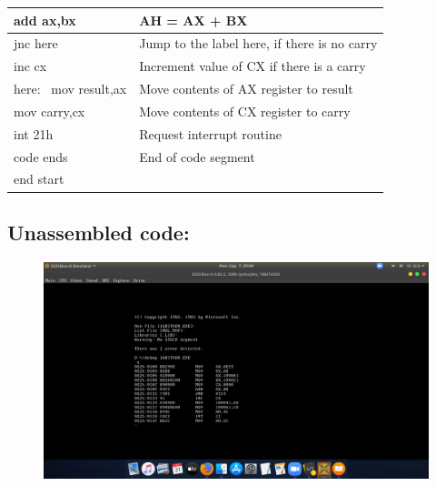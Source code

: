 \documentclass[12pt,a4paper]{article}
\begin{document}
\begin{flushleft}
\begin{table}[htb]
{\begin{tabular}{|l|l|}
\hline
add ax,bx                                                        & AH = AX + BX                                  \\ 
\hline
jnc here                                                         & Jump to the label here, if there is no carry  \\ 
\hline
inc cx                                                           & Increment value of CX if there is a carry     \\ 
\hline
here:~ mov result,ax                                             & Move contents of AX register to result        \\ 
\hline
mov carry,cx                                                     & Move contents of CX register to carry         \\ 
\hline
int 21h                                                          & Request interrupt routine                     \\ 
\hline
code ends                                                        & End of code segment                           \\
\hline
end start                                                        &                                               \\
\hline
\end{tabular}
}
\end{table}

\newpage
\subsection*{\textbf{Unassembled code:}}
\begin{figure}[h]
    \centering
    \includegraphics[trim = 100mm 60mm 150mm 127mm, clip, width = \textwidth]{AdditionUS.png}
\end{figure}

\end{flushleft}
\end{document}
